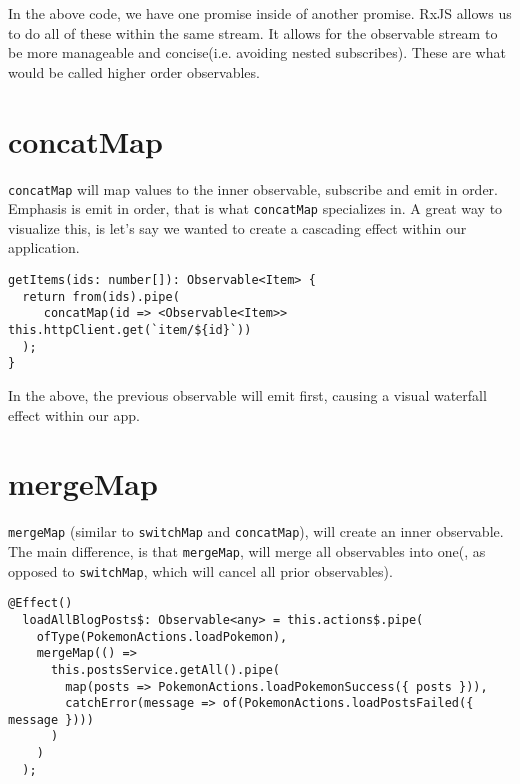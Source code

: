 In the above code, we have one promise inside of another promise. RxJS allows us to do all of these within the same stream. It allows for the observable stream to be more manageable and concise(i.e. avoiding nested subscribes). These are what would be called higher order observables. 

\section{concatMap}
\lstinline{concatMap} will map values to the inner observable, subscribe and 
emit in order. Emphasis is emit in order, that is what \lstinline{concatMap} 
specializes in. A great way to visualize this, is let's say we wanted to 
create a cascading effect within our application. 

\begin{lstlisting}[caption=data-table.component.ts]
getItems(ids: number[]): Observable<Item> {
  return from(ids).pipe(
     concatMap(id => <Observable<Item>> this.httpClient.get(`item/${id}`))
  );
}
\end{lstlisting}

In the above, the previous observable will emit first, causing a visual waterfall effect within our app. 

\section{mergeMap}
\lstinline{mergeMap} (similar to \lstinline{switchMap} and \lstinline{concatMap}),
will create an inner observable. The main difference, is that \lstinline{mergeMap},
will merge all observables into one(, as opposed to \lstinline{switchMap}, 
which will cancel all prior observables).

\begin{lstlisting}[caption=mergeMap example]
  @Effect()
  loadAllBlogPosts$: Observable<any> = this.actions$.pipe(
    ofType(PokemonActions.loadPokemon),
    mergeMap(() =>
      this.postsService.getAll().pipe(
        map(posts => PokemonActions.loadPokemonSuccess({ posts })),
        catchError(message => of(PokemonActions.loadPostsFailed({ message })))
      )
    )
  );  
\end{lstlisting}

